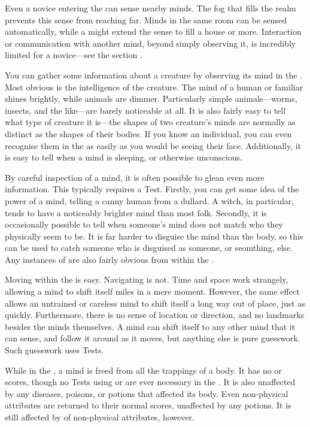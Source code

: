Even a novice entering the {\mentalrealm} can sense nearby minds.
The fog that fills the realm prevents this sense from reaching far.
Minds in the same room can be sensed automatically, while a  might extend the sense to fill a house or more.
Interaction or communication with another mind, beyond simply observing it, is incredibly limited for a novice---see the section .

You can gather some information about a creature by observing its mind in the {\mentalrealm}.
Most obvious is the intelligence of the creature.
The mind of a human or familiar shines brightly, while animals are dimmer.
Particularly simple animals---worms, insects, and the like---are barely noticeable at all.
It is also fairly easy to tell what type of creature it is---the shapes of two creature's minds are normally as distinct as the shapes of their bodies.
If you know an individual, you can even recognise them in the {\mentalrealm} as easily as you would be seeing their face.
Additionally, it is easy to tell when a mind is sleeping, or otherwise unconscious.

By careful inspection of a mind, it is often possible to glean even more information.
This typically requires a  Test.
Firstly, you can get some idea of the power of a mind, telling a canny human from a dullard.
A witch, in particular, tends to have a noticeably brighter mind than most folk.
Secondly, it is occasionally possible to tell when someone's mind does not match who they physically seem to be.
It is far harder to disguise the mind than the body, so this can be used to catch someone who is disguised as someone, or seomthing, else.
Any instances of {\possession} are also fairly obvious from within the {\mentalrealm}.

Moving within the {\mentalrealm} is easy.
Navigating is not.
Time and space work strangely, allowing a mind to shift itself miles in a mere moment.
However, the same effect allows an untrained or careless mind to shift itself a long way out of place, just as quickly.
Furthermore, there is no sense of location or direction, and no landmarks besides the minds themselves.
A mind can shift itself to any other mind that it can sense, and follow it around as it moves, but anything else is pure guesswork.
Such guesswork uses  Tests.

While in the {\mentalrealm}, a mind is freed from all the trappings of a body.
It has no  or  scores, though no Tests using  or  are ever necessary in the {\mentalrealm}.
It is also unaffected by any diseases, poisons, or potions that affected its body.
Even non-physical attributes are returned to their normal scores, unaffected by any potions.
It is still affected by {\exhaustion} of non-physical attributes, however.

